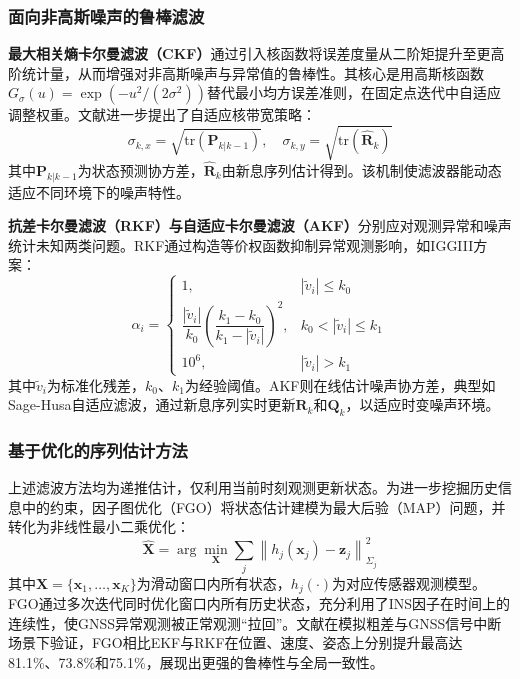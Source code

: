 \subsubsection{面向非高斯噪声的鲁棒滤波}

\textbf{最大相关熵卡尔曼滤波（CKF）}通过引入核函数将误差度量从二阶矩提升至更高阶统计量，从而增强对非高斯噪声与异常值的鲁棒性。其核心是用高斯核函数$G_{\sigma}(u)=\exp(-u^{2}/(2\sigma^{2}))$替代最小均方误差准则，在固定点迭代中自适应调整权重。文献\cite{xie2025adaptive}进一步提出了自适应核带宽策略：
\begin{equation}
\sigma_{k,x} = \sqrt{\mathrm{tr}\left(\mathbf{P}_{k|k-1}\right)},\quad 
\sigma_{k,y} = \sqrt{\mathrm{tr}\left(\hat{\mathbf{R}}_k\right)}
\end{equation}
其中$\mathbf{P}_{k|k-1}$为状态预测协方差，$\hat{\mathbf{R}}_k$由新息序列估计得到。该机制使滤波器能动态适应不同环境下的噪声特性。

\textbf{抗差卡尔曼滤波（RKF）与自适应卡尔曼滤波（AKF）}分别应对观测异常和噪声统计未知两类问题。RKF通过构造等价权函数抑制异常观测影响，如IGGIII方案：
\begin{equation}
\alpha_i = \begin{cases}
1, & |\tilde{v}_i| \leq k_0 \\[4pt]
\dfrac{|\tilde{v}_i|}{k_0}\left(\dfrac{k_1 - k_0}{k_1 - |\tilde{v}_i|}\right)^2, & k_0 < |\tilde{v}_i| \leq k_1 \\[4pt]
10^{6}, & |\tilde{v}_i| > k_1
\end{cases}
\end{equation}
其中$\tilde{v}_i$为标准化残差，$k_0$、$k_1$为经验阈值\cite{yang2010robust}。AKF则在线估计噪声协方差，典型如Sage-Husa自适应滤波\cite{Sage1969AdaptiveFW}，通过新息序列实时更新$\mathbf{R}_k$和$\mathbf{Q}_k$，以适应时变噪声环境。

\subsubsection{基于优化的序列估计方法}

上述滤波方法均为递推估计，仅利用当前时刻观测更新状态。为进一步挖掘历史信息中的约束，因子图优化（FGO）将状态估计建模为最大后验（MAP）问题，并转化为非线性最小二乘优化：
\begin{equation}
\hat{\mathbf{X}} = \arg\min_{\mathbf{X}} \sum_j \left\| h_j(\mathbf{x}_j) - \mathbf{z}_j \right\|_{\Sigma_j}^2
\end{equation}
其中$\mathbf{X}=\{\mathbf{x}_1,\dots,\mathbf{x}_K\}$为滑动窗口内所有状态，$h_j(\cdot)$为对应传感器观测模型。FGO通过多次迭代同时优化窗口内所有历史状态，充分利用了INS因子在时间上的连续性，使GNSS异常观测被正常观测“拉回”\cite{WOS:000652850700001}。文献\cite{electronics14040660}在模拟粗差与GNSS信号中断场景下验证，FGO相比EKF与RKF在位置、速度、姿态上分别提升最高达81.1\%、73.8\%和75.1\%，展现出更强的鲁棒性与全局一致性。

